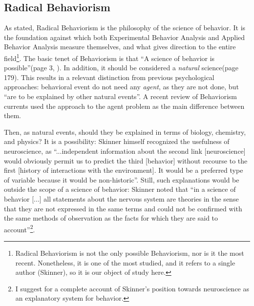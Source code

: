 \documentclass[letterpaper,11pt,twocolumn]{article}
\begin{document}
\subsection*{Radical Behaviorism}
As stated, Radical Behaviorism is the philosophy of the science of behavior. It is the foundation against which both Experimental Behavior Analysis and Applied Behavior Analysis measure themselves, and what gives direction to the entire field\footnote{Radical Behaviorism is not the only possible Behaviorism, nor is it the most recent. Nonetheless, it is one of the most studied, and it refers to a single author (Skinner), so it is our object of study here.}. The basic tenet of Behaviorism is that \enquote{A science of behavior is possible}(page 3, \cite{baumUnderstandingBehaviorismBehavior2017}). In addition, it should be considered a \textit{natural} science\cite{baumWhatRadicalBehaviorism2011}\cite{chiesaRadicalBehaviorismPhilosophy1994}(page 179). This results in a relevant distinction from previous psychological approaches: behavioral event do not need any \textit{agent}, as they are not done, but \enquote{are to be explained by other natural events}\cite{baumWhatRadicalBehaviorism2011}.
A recent review\cite{araibaCurrentDiversificationBehaviorism2020} of Behaviorism currents used the approach to the agent problem as the main difference between them.

Then, as natural events, should they be explained in terms of biology, chemistry, and physics? It is a possibility: Skinner himself recognized the usefulness of neuroscience, as \enquote{...independent information about the second link [neuroscience] would obviously permit us to predict the third [behavior] without recourse to the first [history of interactions with the environment]. It would be a preferred type of variable because it would be non-historic}\cite{skinnerScienceHumanBehavior1953}.
Still, such explanations would be outside the scope of a science of behavior: Skinner noted that \enquote{in a science of behavior [...] all statements about the nervous system are theories in the sense that they are not expressed in the same terms and could not be confirmed with the same methods of observation as the facts for which they are said to account}\cite{skinnerAreTheoriesLearning1950}\footnote{I suggest \cite{zilioWhoWhatWhen2016} for a complete account of Skinner's position towards neuroscience as an explanatory system for behavior.}.
\end{document}
